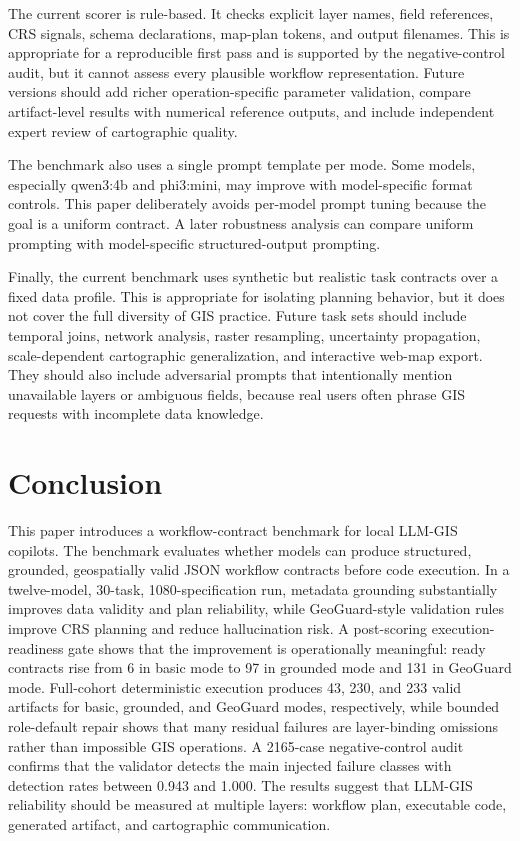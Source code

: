 \documentclass[12pt]{gsis}  %
\begin{document}
The current scorer is rule-based. It checks explicit layer names, field references, CRS signals, schema declarations, map-plan tokens, and output filenames. This is appropriate for a reproducible first pass and is supported by the negative-control audit, but it cannot assess every plausible workflow representation. Future versions should add richer operation-specific parameter validation, compare artifact-level results with numerical reference outputs, and include independent expert review of cartographic quality.

The benchmark also uses a single prompt template per mode. Some models, especially qwen3:4b and phi3:mini, may improve with model-specific format controls. This paper deliberately avoids per-model prompt tuning because the goal is a uniform contract. A later robustness analysis can compare uniform prompting with model-specific structured-output prompting.

Finally, the current benchmark uses synthetic but realistic task contracts over a fixed data profile. This is appropriate for isolating planning behavior, but it does not cover the full diversity of GIS practice. Future task sets should include temporal joins, network analysis, raster resampling, uncertainty propagation, scale-dependent cartographic generalization, and interactive web-map export. They should also include adversarial prompts that intentionally mention unavailable layers or ambiguous fields, because real users often phrase GIS requests with incomplete data knowledge.

\section{Conclusion}

This paper introduces a workflow-contract benchmark for local LLM-GIS copilots. The benchmark evaluates whether models can produce structured, grounded, geospatially valid JSON workflow contracts before code execution. In a twelve-model, 30-task, 1080-specification run, metadata grounding substantially improves data validity and plan reliability, while GeoGuard-style validation rules improve CRS planning and reduce hallucination risk. A post-scoring execution-readiness gate shows that the improvement is operationally meaningful: ready contracts rise from 6 in basic mode to 97 in grounded mode and 131 in GeoGuard mode. Full-cohort deterministic execution produces 43, 230, and 233 valid artifacts for basic, grounded, and GeoGuard modes, respectively, while bounded role-default repair shows that many residual failures are layer-binding omissions rather than impossible GIS operations. A 2165-case negative-control audit confirms that the validator detects the main injected failure classes with detection rates between 0.943 and 1.000. The results suggest that LLM-GIS reliability should be measured at multiple layers: workflow plan, executable code, generated artifact, and cartographic communication.
\end{document}
